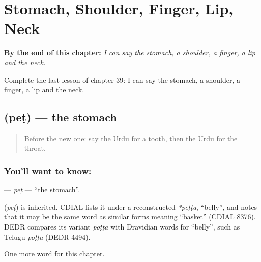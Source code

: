
\chapter{Stomach, Shoulder, Finger, Lip, Neck}
\label{ch:ur-stomach-shoulder-finger-lip-neck}

\begin{chapteropening}
\textbf{By the end of this chapter:} \emph{I can say the stomach, a shoulder, a finger, a lip and the neck.}

Complete the last lesson of chapter 39: I can say the stomach, a shoulder, a finger, a lip and the neck.
\end{chapteropening}

\section[\texorpdfstring{\ur{پیٹ} (peṭ)}{پیٹ (peṭ)}]{ (peṭ) — the stomach}

\label{lesson:UR-C39-pet}



\begin{quote}
Before the new one: say the Urdu for a tooth, then the Urdu for the throat.
\end{quote}

\subsection*{You'll want to know: }
\textbf{} — \emph{peṭ} — \textquotedblleft{}the stomach\textquotedblright{}.

\begin{cousinweb}
\textbf{} (\emph{peṭ}) is inherited. CDIAL lists it under a reconstructed \emph{*peṭṭa}, \textquotedblleft{}belly\textquotedblright{}, and notes that it may be the same word as similar forms meaning \textquotedblleft{}basket\textquotedblright{} (CDIAL 8376). DEDR compares its variant \emph{poṭṭa} with Dravidian words for \textquotedblleft{}belly\textquotedblright{}, such as Telugu \emph{poṭṭa} (DEDR 4494).
\end{cousinweb}

\begin{grammarlens}[title={What you've built}]
One more word for this chapter.
\end{grammarlens}

